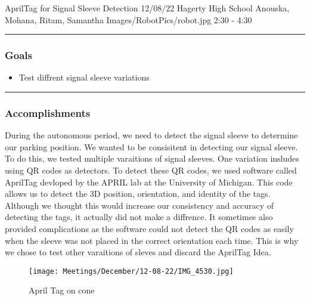 \insertmeeting 
	{AprilTag for Signal Sleeve Detection} 
	{12/08/22}
	{Hagerty High School}
	{Anouska, Mohana, Ritam, Samantha}
	{Images/RobotPics/robot.jpg}
	{2:30 - 4:30}
	
\noindent\hfil\rule{\textwidth}{.4pt}\hfil
\subsubsection*{Goals}
\begin{itemize}
    \item Test diffrent signal sleeve variations

\end{itemize} 

\noindent\hfil\rule{\textwidth}{.4pt}\hfil

\subsubsection*{Accomplishments}
During the autonomous period, we need to detect the signal sleeve to determine our parking position. We wanted to be consisitent in detecting our signal sleeve. To do this, we tested multiple varaitions of signal sleeves. One variation insludes using QR codes as detectors. To detect these QR codes, we used software called AprilTag devloped by the APRIL lab at the University of Michigan. This code allows us to detect the 3D position, orientation, and identity of the tags. Although we thought this would increase our consistency and accuracy of detecting the tags, it actually did not make a diffrence. It sometimes also provided complications as the software could not detect the QR codes as easily when the sleeve was not placed in the correct orientation each time. This is why we chose to test other varaitions of sleves and discard the AprilTag Idea. 

\begin{figure}[htp]
\centering
\texttt{[image: Meetings/December/12-08-22/IMG\_4530.jpg]}
\caption{April Tag on cone}
\label{fig:082322}
\end{figure}




